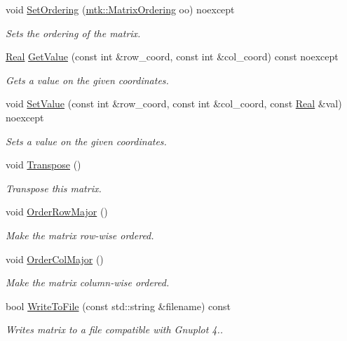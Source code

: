 \begin{DoxyCompactItemize}
void \hyperlink{classmtk_1_1DenseMatrix_a178e63f365cf8c547dc5020c60357f5e}{Set\+Ordering} (\hyperlink{group__c02-enums_ga622801bd9f912d0f976c3e383f5f581c}{mtk\+::\+Matrix\+Ordering} oo) noexcept
\begin{DoxyCompactList}\small\item\em Sets the ordering of the matrix. \end{DoxyCompactList}\item 
\hyperlink{group__c01-roots_gac080bbbf5cbb5502c9f00405f894857d}{Real} \hyperlink{classmtk_1_1DenseMatrix_a4b23ecbebd970b5eea915dbb50691024}{Get\+Value} (const int \&row\+\_\+coord, const int \&col\+\_\+coord) const noexcept
\begin{DoxyCompactList}\small\item\em Gets a value on the given coordinates. \end{DoxyCompactList}\item 
void \hyperlink{classmtk_1_1DenseMatrix_a784ce5784109ac86bfb9d8562b334b13}{Set\+Value} (const int \&row\+\_\+coord, const int \&col\+\_\+coord, const \hyperlink{group__c01-roots_gac080bbbf5cbb5502c9f00405f894857d}{Real} \&val) noexcept
\begin{DoxyCompactList}\small\item\em Sets a value on the given coordinates. \end{DoxyCompactList}\item 
void \hyperlink{classmtk_1_1DenseMatrix_a71d9c07ca66e88d97d1fd5012f43138b}{Transpose} ()
\begin{DoxyCompactList}\small\item\em Transpose this matrix. \end{DoxyCompactList}\item 
void \hyperlink{classmtk_1_1DenseMatrix_ac2949efba3e8278335d45418c85433e4}{Order\+Row\+Major} ()
\begin{DoxyCompactList}\small\item\em Make the matrix row-\/wise ordered. \end{DoxyCompactList}\item 
void \hyperlink{classmtk_1_1DenseMatrix_a59b9bea24acf39dca64e8549b3527463}{Order\+Col\+Major} ()
\begin{DoxyCompactList}\small\item\em Make the matrix column-\/wise ordered. \end{DoxyCompactList}\item 
bool \hyperlink{classmtk_1_1DenseMatrix_ab396804fb5f188e1eaa8578c738c59fc}{Write\+To\+File} (const std\+::string \&filename) const 
\begin{DoxyCompactList}\small\item\em Writes matrix to a file compatible with Gnuplot 4.. \end{DoxyCompactList}\end{DoxyCompactItemize}
